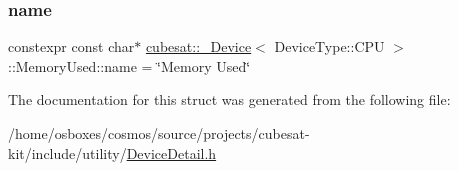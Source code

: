 \subsubsection{\texorpdfstring{name}{name}}
{\footnotesize\ttfamily constexpr const char$\ast$ \hyperlink{structcubesat_1_1__Device}{cubesat\+::\+\_\+\+Device}$<$ Device\+Type\+::\+C\+PU $>$\+::Memory\+Used\+::name = \char`\"{}Memory Used\char`\"{}\hspace{0.3cm}{\ttfamily [static]}}



The documentation for this struct was generated from the following file\+:\begin{DoxyCompactItemize}
\item 
/home/osboxes/cosmos/source/projects/cubesat-\/kit/include/utility/\hyperlink{DeviceDetail_8h}{Device\+Detail.\+h}\end{DoxyCompactItemize}
